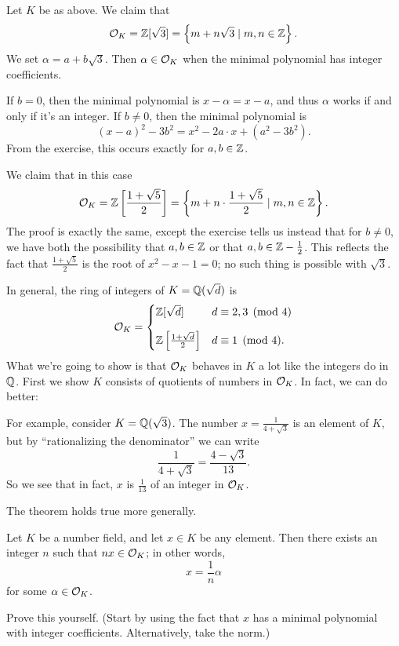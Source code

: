\begin{example}
	[Ring of integers of $K = \QQ(\sqrt3)$]
	Let $K$ be as above.
	We claim that \[ \mathcal O_K = \mathbb Z[\sqrt 3] = \left\{ m + n\sqrt 3 \mid m,n \in \mathbb Z  \right\}. \]
	We set $\alpha = a + b \sqrt 3$.
	Then $\alpha \in \mathcal O_K$ when the minimal polynomial has integer coefficients.

	If $b = 0$, then the minimal polynomial is $x-\alpha=x-a$,
	and thus $\alpha$ works if and only if it's an integer.
	If $b \neq 0$, then the minimal polynomial is
	\[ (x-a)^2 - 3b^2 = x^2 - 2a \cdot x + (a^2-3b^2). \]
	From the exercise, this occurs exactly for $a,b \in \mathbb Z$.
\end{example}
\begin{example}
	[Ring of integers of $K = \QQ(\sqrt 5)$]
	We claim that in this case
	\[ \mathcal O_K = \mathbb Z\left[ \frac{1+\sqrt5}{2} \right]
	= \left\{ m + n \cdot \frac{1+\sqrt5}{2} \mid m,n \in \mathbb Z \right\}. \]
	The proof is exactly the same, except the exercise tells us instead
	that for $b \neq 0$, we have both the possibility that $a,b \in \mathbb Z$
	or that $a,b \in \mathbb Z - \frac{1}{2}$.
	This reflects the fact that $\frac{1+\sqrt5}{2}$ is the root of $x^2-x-1 = 0$;
	no such thing is possible with $\sqrt 3$.
\end{example}
In general, the ring of integers of $K = \mathbb Q(\sqrt d)$ is
\[ \mathcal O_K 
	=
	\begin{cases}
		\mathbb Z[\sqrt d] & d\equiv 2,3 \pmod 4 \\[1em]
		\mathbb Z\left[ \frac{1+\sqrt d}{2} \right] & d \equiv 1 \pmod 4.
	\end{cases}
\]
What we're going to show is that $\mathcal O_K$ behaves in $K$
a lot like the integers do in $\mathbb Q$.
First we show $K$ consists of quotients of numbers in $\mathcal O_K$.
In fact, we can do better:
\begin{example}
	For example, consider $K = \QQ(\sqrt3)$.
	The number $x = \frac{1}{4+\sqrt3}$ is an element of $K$, but by
	``rationalizing the denominator'' we can write
	\[ \frac{1}{4+\sqrt3} = \frac{4-\sqrt3}{13}. \]
	So we see that in fact, $x$ is $\frac{1}{13}$ of an integer in $\mathcal O_K$.
\end{example}

The theorem holds true more generally.
\begin{theorem}[$K = \QQ \cdot \OO_K$]
	Let $K$ be a number field, and let $x \in K$ be any element.
	Then there exists an integer $n$ such that $nx \in \mathcal O_K$;
	in other words, \[ x = \frac 1n \alpha \] for some $\alpha \in \mathcal O_K$.
\end{theorem}
\begin{exercise}
	Prove this yourself.
	(Start by using the fact that $x$ has a minimal
	polynomial with integer coefficients.
	Alternatively, take the norm.)
\end{exercise}

